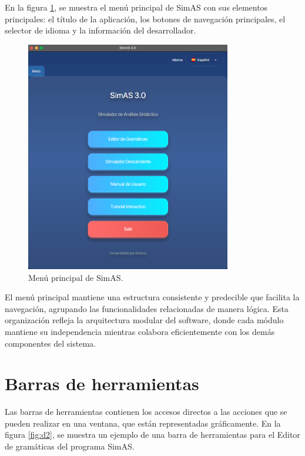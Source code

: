 En la figura \ref{fig:d1}, se muestra el menú principal de SimAS con sus elementos principales: el título de la aplicación, los botones de navegación principales, el selector de idioma y la información del desarrollador.

\needspace{8cm}
\begin{figure}[H]
\centering
\includegraphics[width=0.8\textwidth]{figuras2/menu.png}
\caption{Menú principal de SimAS.}
\label{fig:d1}
\end{figure}

El menú principal mantiene una estructura consistente y predecible que facilita la navegación, agrupando las funcionalidades relacionadas de manera lógica. Esta organización refleja la arquitectura modular del software, donde cada módulo mantiene su independencia mientras colabora eficientemente con los demás componentes del sistema. 

\section{Barras de herramientas}

Las barras de herramientas contienen los accesos directos a las acciones que se pueden realizar en una ventana, que están representadas gráficamente. En la figura \ref{fig:d2}, se muestra un ejemplo de una barra de herramientas para el Editor de gramáticas del programa SimAS.

